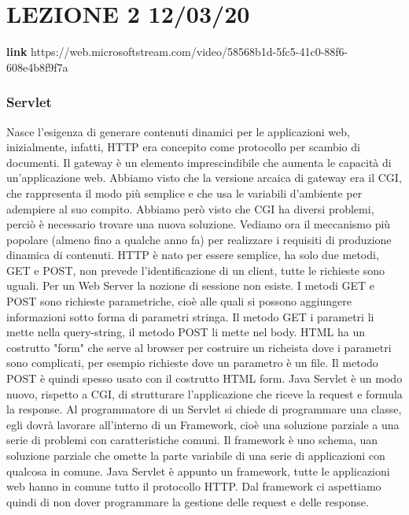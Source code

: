 \section{LEZIONE 2 12/03/20}
\textbf{link} https://web.microsoftstream.com/video/58568b1d-5fc5-41c0-88f6-608e4b8f9f7a
\subsubsection{Servlet}
Nasce l'esigenza di generare contenuti dinamici per le applicazioni web, inizialmente, infatti, HTTP era concepito come protocollo per scambio di documenti.\newline
Il gateway è un elemento imprescindibile che aumenta le capacità di un'applicazione web. Abbiamo visto che la versione arcaica di gateway era il CGI, che rappresenta il modo più semplice e che usa le variabili d'ambiente per adempiere al suo compito. Abbiamo però visto che CGI ha diversi problemi, perciò è necessario trovare una nuova soluzione.\newline
Vediamo ora il meccanismo più popolare (almeno fino a qualche anno fa) per realizzare i requisiti di produzione dinamica di contenuti. HTTP è nato per essere semplice, ha solo due metodi, GET e POST, non prevede l'identificazione di un client, tutte le richieste sono uguali. Per un Web Server la nozione di sessione non esiste. I metodi GET e POST sono richieste parametriche, cioè alle quali si possono aggiungere informazioni sotto forma di parametri stringa. Il metodo GET i parametri li mette nella query-string, il metodo POST li mette nel body. HTML ha un costrutto "form" che serve al browser per costruire un richeista dove i parametri sono complicati, per esempio richieste dove un parametro è un file. Il metodo POST è quindi spesso usato con il costrutto HTML form.\newline
Java Servlet è un modo nuovo, rispetto a CGI, di strutturare l'applicazione che riceve la request e formula la response.\newline
Al programmatore di un Servlet si chiede di programmare una classe, egli dovrà lavorare all'interno di un Framework, cioè una soluzione parziale a una serie di problemi con caratteristiche comuni. Il framework è uno schema, uan soluzione parziale che omette la parte variabile di una serie di applicazioni con qualcosa in comune. Java Servlet è appunto un framework, tutte le applicazioni web hanno in comune tutto il protocollo HTTP. Dal framework ci aspettiamo quindi di non dover programmare la gestione delle request e delle response.\newline
